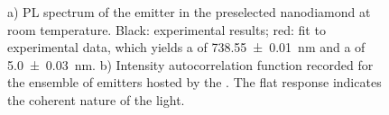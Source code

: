 				\begin{figure}[htp]
					\begin{subfigure}[t]{ 0.49\linewidth}
						\centering
						\caption{}
						\label{subfig::spectrum_nd_multiple}
					\end{subfigure}
					\hfill
					\begin{subfigure}[t]{ 0.49\linewidth}
						\centering
						\caption{}
						\label{subfig::coherent_g2}
					\end{subfigure}
					\caption[Properties of a \nd containing an ensemble of \sivs]{a) PL spectrum of the emitter in the preselected nanodiamond at room temperature. Black: experimental results; red: fit to experimental data, which yields a \ZPL \cwl of \SI[separate-uncertainty = true]{738.55\pm0.01}{nm} and a \lw of \SI[separate-uncertainty = true]{5.0\pm0.03}{nm}. b) Intensity autocorrelation function recorded for the ensemble of emitters hosted by the \nd. The flat response indicates the coherent nature of the \fl light.}
				\end{figure}

